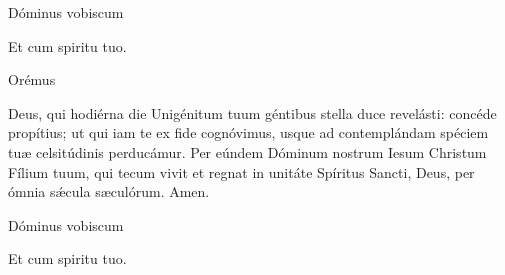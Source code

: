 


\rubric{\Vbar\ } Dóminus vobiscum

\rubric{\Rbar\ } Et cum spiritu tuo.

Orémus

Deus, qui hodiérna die Unigénitum tuum géntibus stella duce revelásti: concéde propítius; ut qui iam te ex fide cognóvimus, usque ad contemplándam spéciem tuæ celsitúdinis perducámur. Per eúndem Dóminum nostrum Iesum Christum Fílium tuum, qui tecum vivit et regnat in unitáte Spíritus Sancti, Deus, per ómnia sǽcula sæculórum. \rubric{\Rbar\ } Amen.

\rubric{\Vbar\ } Dóminus vobiscum

\rubric{\Rbar\ } Et cum spiritu tuo.
